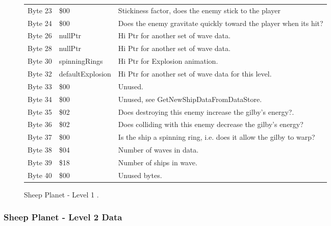 \begin{figure}[H]
{\begin{adjustbox}{width=12cm}
\begin{tabular}{lll}
 Byte 23 & \$00                       & Stickiness factor, does the enemy stick to the player              \\
 Byte 24 & \$00                       & Does the enemy gravitate quickly toward the player when its hit?   \\
 Byte 26 & nullPtr                   & Hi Ptr for another set of wave data.                               \\
 Byte 28 & nullPtr                   & Hi Ptr for another set of wave data.                               \\
 Byte 30 & spinningRings             & Hi Ptr for Explosion animation.                                    \\
 Byte 32 & defaultExplosion          & Hi Ptr for another set of wave data for this level.                \\
 Byte 33 & \$00                       & Unused.                                                            \\
 Byte 34 & \$00                       & Unused, see GetNewShipDataFromDataStore.                           \\
 Byte 35 & \$02                       & Does destroying this enemy increase the gilby's energy?.           \\
 Byte 36 & \$02                       & Does colliding with this enemy decrease the gilby's energy?        \\
 Byte 37 & \$00                       & Is the ship a spinning ring, i.e. does it allow the gilby to warp? \\
 Byte 38 & \$04                       & Number of waves in data.                                           \\
 Byte 39 & \$18                       & Number of ships in wave.                                           \\
 Byte 40 & \$00                       & Unused bytes.                                                      \\
\bottomrule
\end{tabular}

  \end{adjustbox}

  }\caption*{Sheep Planet - Level 1
.}
\end{figure}

\clearpage
\subsubsection{Sheep Planet - Level 2 Data}

